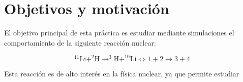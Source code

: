 

\section{Objetivos y motivación}

El objetivo principal de esta práctica es estudiar mediante simulaciones el comportamiento de la siguiente reacción nuclear:

\begin{equation}
	^{11}\mathrm{Li}+^2\mathrm{H} \rightarrow ^3\mathrm{H}+^{10}\mathrm{Li} \Longleftrightarrow 1 + 2 \rightarrow 3 + 4
\end{equation}

Esta reacción es de alto interés en la física nuclear, ya que permite estudiar 